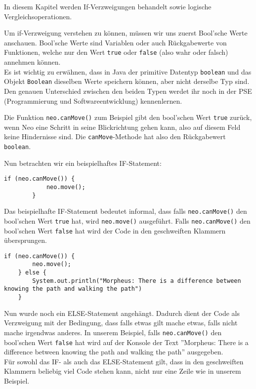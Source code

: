

In diesem Kapitel werden If-Verzweigungen behandelt sowie logische Vergleichsoperationen.

\begin{Infobox}
    Um if-Verzweigung verstehen zu können, müssen wir uns zuerst Bool'sche Werte anschauen. Bool'sche Werte sind Variablen oder auch Rückgabewerte von Funktionen, welche nur den Wert \lstinline{true} oder \lstinline{false} (also wahr oder falsch) annehmen können. \\
    
    Es ist wichtig zu erwähnen, dass in Java der primitive Datentyp \lstinline{boolean} und das Objekt \lstinline{Boolean} dieselben Werte speichern können, aber nicht derselbe Typ sind.
    Den genauen Unterschied zwischen den beiden Typen werdet ihr noch in der PSE (Programmierung und Softwareentwicklung) kennenlernen.
    
    Die Funktion \lstinline{neo.canMove()} zum Beispiel gibt den bool'schen Wert \lstinline{true} zurück, wenn Neo eine Schritt in seine Blickrichtung gehen kann, also auf diesem Feld keine Hindernisse sind.
    Die \lstinline{canMove}-Methode hat also den Rückgabewert \lstinline{boolean}.
    
\end{Infobox}

\begin{Infobox}[IF-Verzweigung]
    Nun betrachten wir ein beispielhaftes IF-Statement:

    \begin{lstlisting}[breaklines=true, numbers=none]
        if (neo.canMove()) {
            neo.move();
        } 
    \end{lstlisting}

    Das beispielhafte IF-Statement bedeutet informal, dass falls \lstinline{neo.canMove()} den bool'schen Wert \lstinline{true} hat, wird \lstinline{neo.move()} ausgeführt. Falls \lstinline{neo.canMove()} den bool'schen Wert \lstinline{false} hat wird der Code in den geschweiften Klammern übersprungen.

    \begin{lstlisting}[breaklines=true, numbers=none]
    if (neo.canMove()) {
        neo.move();
    } else {
        System.out.println("Morpheus: There is a difference between knowing the path and walking the path")
    }
    \end{lstlisting}

    Nun wurde noch ein ELSE-Statement angehängt. Dadurch dient der Code als Verzweigung mit der Bedingung, dass falls etwas gilt mache etwas, falls nicht mache irgendwas anderes. In unserem Beispiel, falls \lstinline{neo.canMove()} den bool'schen Wert \lstinline{false} hat wird auf der Konsole der Text ''Morpheus: There is a difference between knowing the path and walking the path'' ausgegeben.\\

    Für sowohl das IF- als auch das ELSE-Statement gilt, dass in den geschweiften Klammern beliebig viel Code stehen kann, nicht nur eine Zeile wie in unserem Beispiel.
\end{Infobox}

